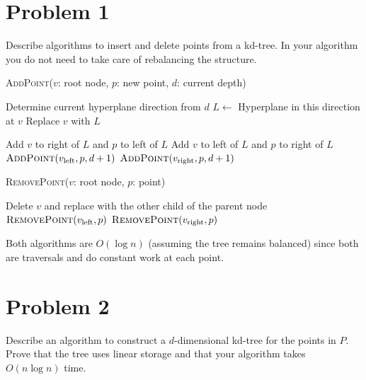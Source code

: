 \documentclass[12pt]{extarticle}
\begin{document}
\section*{Problem 1}
Describe algorithms to insert and delete points from a kd-tree. In your algorithm you do not need to take care of rebalancing the structure.

\begin{solution}
    \begin{algorithm}[H]
        \caption{\textsc{AddPoint}($v$: root node, $p$: new point, $d$: current depth)}
        \begin{algorithmic}
                \State Determine current hyperplane direction from $d$
                \State $L \gets $ Hyperplane in this direction at $v$
                \State Replace $v$ with $L$

                    \State Add $v$ to right of $L$ and $p$ to left of $L$
                \Else
                    \State Add $v$ to left of $L$ and $p$ to right of $L$
                \EndIf
            \Else
                    \State $\textsc{AddPoint}(v_{\text{left}}, p, d+1)$
                \Else 
                    \State $\textsc{AddPoint}(v_{\text{right}}, p, d+1)$
                \EndIf
            \EndIf
        \end{algorithmic}
    \end{algorithm}
    \begin{algorithm}[H]
        \caption{\textsc{RemovePoint}($v$: root node, $p$: point)}
        \begin{algorithmic}
                \State Delete $v$ and replace with the other child of the parent node
            \Else
                    \State $\textsc{RemovePoint}(v_{\text{left}}, p)$
                \Else 
                    \State $\textsc{RemovePoint}(v_{\text{right}}, p)$
                \EndIf
            \EndIf
        \end{algorithmic}
    \end{algorithm}
    Both algorithms are $O(\log n)$ (assuming the tree remains balanced) since both are traversals and do constant work at each point.
\end{solution}

\section*{Problem 2}
Describe an algorithm to construct a $d$-dimensional kd-tree for the points in $P$. Prove that the tree uses linear storage and that your algorithm takes $O(n \log n)$ time.
\end{document}
